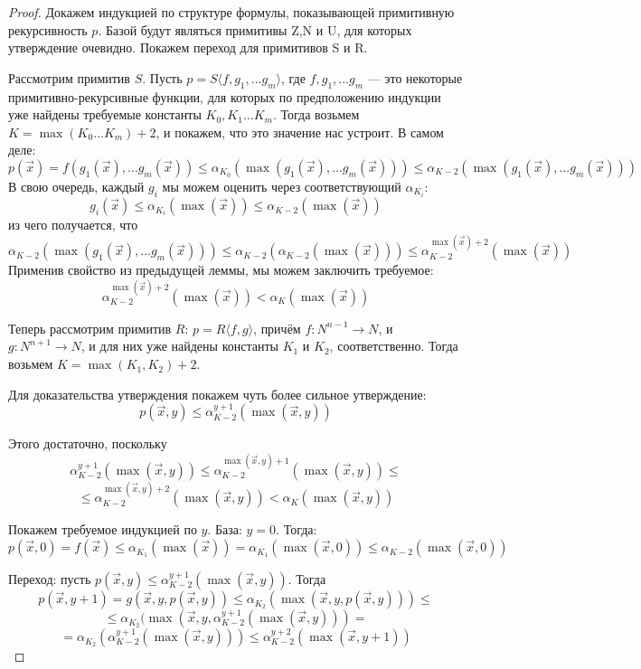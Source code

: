 \begin{proof}
Докажем индукцией по структуре формулы, показывающей примитивную 
рекурсивность $p$.
Базой будут являться примитивы Z,N и U, для которых утверждение очевидно.
Покажем переход для примитивов S и R.

Рассмотрим примитив $S$. Пусть $p = S\langle f,g_1,\dots g_m \rangle$,
где $f, g_1, \dots g_m$ --- это некоторые примитивно-рекурсивные функции, 
для которых по предположению индукции уже найдены требуемые константы 
$K_0, K_1 \dots K_m$.
Тогда возьмем $K = \max (K_0 \dots K_m)+2$, и покажем, что это значение нас
устроит.
В самом деле: 
$$p(\overrightarrow{x}) = f(g_1(\overrightarrow{x}), \dots g_m(\overrightarrow{x}))
\le \alpha_{K_0}(\max (g_1(\overrightarrow{x}), \dots g_m(\overrightarrow{x})))
\le \alpha_{K-2}(\max (g_1(\overrightarrow{x}), \dots g_m(\overrightarrow{x})))$$
В свою очередь, каждый $g_i$ мы можем оценить через соответствующий $\alpha_{K_i}$:
$$g_i(\overrightarrow{x}) \le \alpha_{K_i}(\max(\overrightarrow{x})) \le \alpha_{K-2}(\max(\overrightarrow{x}))$$
из чего получается, что 
$$\alpha_{K-2}(\max (g_1(\overrightarrow{x}), \dots g_m(\overrightarrow{x}))) \le 
\alpha_{K-2}(\alpha_{K-2}(\max(\overrightarrow{x}))) \le \alpha_{K-2}^{\max(\overrightarrow{x})+2}(\max(\overrightarrow{x}))$$
Применив свойство из предыдущей леммы, мы можем заключить требуемое:
$$\alpha_{K-2}^{\max(\overrightarrow{x})+2}(\max(\overrightarrow{x})) < \alpha_K(\max(\overrightarrow{x}))$$

Теперь рассмотрим примитив $R$: $p = R\langle f,g \rangle$,
причём $f: N^{n-1} \rightarrow N$, и $g: N^{n+1} \rightarrow N$,
и для них уже найдены константы $K_1$ и $K_2$, соответственно.
Тогда возьмем $K = \max(K_1, K_2)+2$.

Для доказательства утверждения покажем чуть более сильное утверждение:
$$p(\overrightarrow{x},y) \le \alpha_{K-2}^{y+1}(\max(\overrightarrow{x},y))$$

Этого достаточно, поскольку 
$$\alpha_{K-2}^{y+1}(\max(\overrightarrow{x},y)) \le
\alpha_{K-2}^{\max(\overrightarrow{x},y)+1}(\max(\overrightarrow{x},y)) \le$$
$$\le \alpha_{K-2}^{\max(\overrightarrow{x},y)+2}(\max(\overrightarrow{x},y)) <
\alpha_K(\max(\overrightarrow{x},y))$$

Покажем требуемое индукцией по $y$.
База: $y = 0$. Тогда: $$p(\overrightarrow{x},0) = f(\overrightarrow{x}) \le 
\alpha_{K_1}(\max(\overrightarrow{x})) = \alpha_{K_1}(\max(\overrightarrow{x},0)) \le 
\alpha_{K-2}(\max(\overrightarrow{x},0))$$

Переход: пусть $p(\overrightarrow{x},y) \le \alpha^{y+1}_{K-2}(\max(\overrightarrow{x},y))$.
Тогда $$p(\overrightarrow{x},y+1) = g(\overrightarrow{x},y,p(\overrightarrow{x},y))
\le \alpha_{K_2}(\max(\overrightarrow{x},y,p(\overrightarrow{x},y))) \le$$
$$\le \alpha_{K_2}(\max(\overrightarrow{x},y,\alpha^{y+1}_{K-2}(\max(\overrightarrow{x},y))) =$$
$$= \alpha_{K_2}(\alpha^{y+1}_{K-2}(\max(\overrightarrow{x},y)))
\le \alpha^{y+2}_{K-2}(\max(\overrightarrow{x},y+1))$$
\end{proof}

